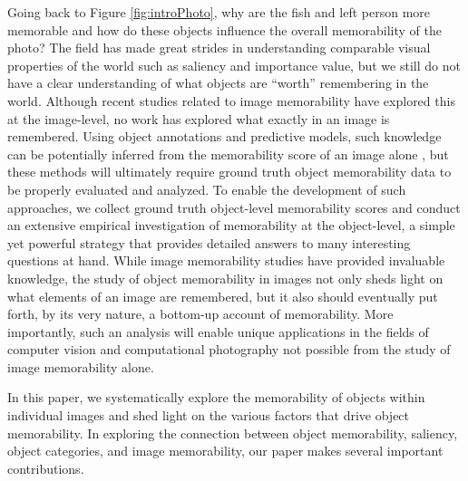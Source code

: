 Going back to Figure \ref{fig:introPhoto}, why are the fish and left person more memorable and how do these objects influence the overall memorability of the photo? The field has made great strides in understanding comparable visual  properties of the world such as saliency \cite{it} and importance \cite{berg12} value, but we still do not have a clear understanding of what objects are ``worth” remembering in the world. Although recent studies related to image memorability \cite{isola11,isola11nips,khosla13,isola14,zoya15} have explored this at the image-level, no work has explored what exactly in an image is remembered. Using object annotations and predictive models, such knowledge can be potentially inferred from the memorability score of an image alone \cite{khosla12}, but these methods will ultimately require ground truth object memorability data to be properly evaluated and analyzed. To enable the development of such approaches, we collect ground truth object-level memorability scores and conduct an extensive empirical investigation of  memorability at the object-level, a simple yet powerful strategy that provides detailed answers to many interesting questions at hand. While image memorability studies have provided invaluable knowledge, the study of object memorability in images not only sheds light on what elements of an image are remembered, but it also should eventually put forth, by its very nature, a bottom-up account of memorability. More importantly, such an analysis will enable unique applications in the fields of computer vision and computational photography not possible from the study of image memorability alone.

In this paper, we systematically explore the memorability of objects within individual images and shed light on the various factors that drive object memorability. In exploring the connection between object memorability, saliency, object categories, and image memorability, our paper makes several important contributions.

